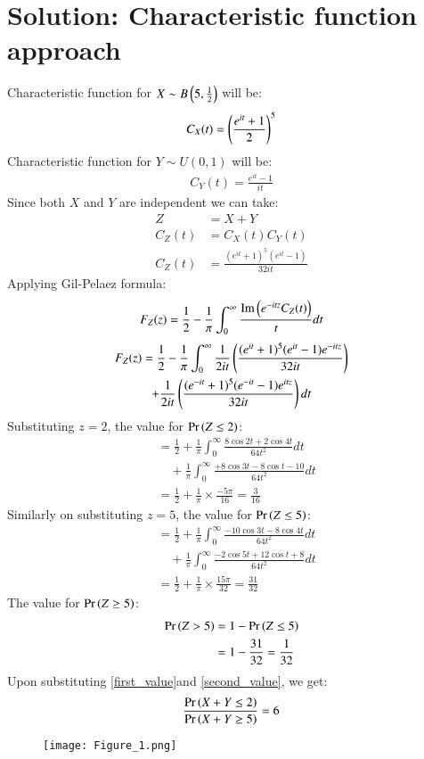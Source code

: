 \documentclass[journal,12pt,twocolumn]{IEEEtran}
\begin{document}
\section*{Solution: Characteristic function approach}
Characteristic function for $X \sim B\left(5,\frac{1}{2}\right)$ will be:
\begin{align}
    C_X(t)=\left(\frac{e^{it}+1}{2}\right)^5
\end{align}
Characteristic function for $Y \sim U(0,1)$ will be:
\begin{align}
    C_Y(t)=\frac{e^{it}-1}{it}
\end{align}
Since both $X$ and $Y$ are independent we can take:
\begin{align}
    Z&=X+Y\\
    C_Z(t)&=C_X(t)C_Y(t)\\
    C_Z(t)&= \frac{(e^{it}+1)^5(e^{it}-1)}{32it}
\end{align}
Applying Gil-Pelaez formula:
\begin{align}
    F_Z(z)=\frac{1}{2}-\frac{1}{\pi}\int_0^\infty \frac{\text{Im}\left(e^{-itz}C_Z(t)\right)}{t}dt
\end{align}
\begin{multline*}
    F_Z(z)=\frac{1}{2}-\frac{1}{\pi}\int_0^\infty\frac{1}{2it}\left(\frac{(e^{it}+1)^5(e^{it}-1)e^{-itz}}{32it}\right)\\+\frac{1}{2it}\left(\frac{(e^{-it}+1)^5(e^{-it}-1)e^{itz}}{32it}\right)dt
\end{multline*}
Substituting $z=2$, the value for $\Pr\left(Z\leq 2\right)$:
\begin{align}
\nonumber
    &=\frac{1}{2}+\frac{1}{\pi}\int_0^\infty \frac{8\cos{2t}+2\cos{4t}}{64t^2}dt\\
    &\quad+\frac{1}{\pi}\int_0^\infty\frac{+8\cos{3t}-8\cos{t}-10}{64t^2}dt\\
    &=\frac{1}{2}+\frac{1}{\pi}\times\frac{-5\pi}{16}=\frac{3}{16}\label{first_value}
\end{align}
Similarly on substituting $z=5$, the value for $\Pr\left(Z\leq 5\right)$:
\begin{align}
\nonumber
    &=\frac{1}{2} +\frac{1}{\pi}\int_0^\infty\frac{-10\cos{3t}-8\cos{4t}}{64t^2}dt\\&\quad +\frac{1}{\pi}\int_0^\infty\frac{-2\cos{5t}+12\cos{t}+8}{64t^2}dt\\
    &=\frac{1}{2}+\frac{1}{\pi}\times \frac{15\pi}{32}=\frac{31}{32}
\end{align}
The value for $\Pr\left(Z\geq 5\right)$:
\begin{align}
    \Pr\left(Z>5\right)&=1-\Pr\left(Z\leq 5\right)\\
    &=1-\frac{31}{32}=\frac{1}{32}\label{second_value}
\end{align}
Upon substituting \eqref{first_value}and \eqref{second_value}, we get:
\begin{align}
    \frac{\Pr\left(X+Y \leq 2\right)}{\Pr\left(X+Y \geq 5\right)} = 6
\end{align}
\begin{figure}[h]
    \centering
    \texttt{[image: Figure\_1.png]}
    \caption{}
    \label{fig:my_label}
\end{figure}
\end{document}

